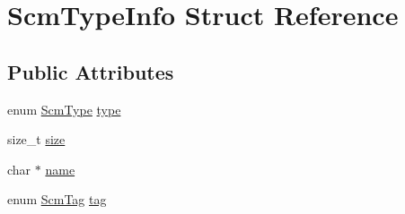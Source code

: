 \hypertarget{struct_scm_type_info}{\section{Scm\-Type\-Info Struct Reference}
\label{struct_scm_type_info}
}
\subsection*{Public Attributes}
\begin{DoxyCompactItemize}
\item 
enum \hyperlink{eva_8h_a45893d6e68c3cf00ec5a56f9ef640d7f}{Scm\-Type} \hyperlink{struct_scm_type_info_a5175fb185faeb2a7d850722b69261020}{type}
\item 
size\-\_\-t \hyperlink{struct_scm_type_info_aadc9bead183de5c73f040483e75f4cda}{size}
\item 
char $\ast$ \hyperlink{struct_scm_type_info_a4f02cc650f88528a74fce2469a22e876}{name}
\item 
enum \hyperlink{eva_8c_a0ddd137f31ae42c3b0e13f61a66bde58}{Scm\-Tag} \hyperlink{struct_scm_type_info_ad0f20b93db78565e8537d101e97d1bf0}{tag}
\end{DoxyCompactItemize}


